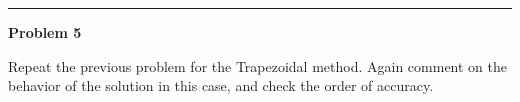 \documentclass[10pt]{article}
\begin{document}



\vskip 1cm
\hrule
{\bf Problem 5}

Repeat the previous problem for the Trapezoidal method.  
Again comment on the behavior of the solution in this case, 
and check the order of accuracy.

\end{document}
